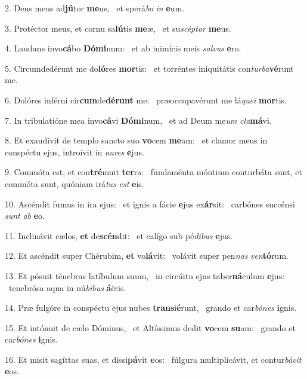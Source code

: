 2. Deus meus ad\textbf{jú}tor \textbf{me}us, \ast\  et sperá\textit{bo} \textit{in} \textbf{e}um.\

3. Protéctor meus, et cornu sa\textbf{lú}tis \textbf{me}æ, \ast\  et su\textit{scép}\textit{tor} \textbf{me}us.\

4. Laudans invo\textbf{cá}bo \textbf{Dó}\textbf{mi}num: \ast\  et ab inimícis meis \textit{sal}\textit{vus} \textbf{e}ro.\

5. Circumdedérunt me do\textbf{ló}res \textbf{mor}tis: \ast\  et torréntes iniquitátis con\textit{tur}\textit{ba}\textbf{vé}runt me.\

6. Dolóres inférni cir\textbf{cum}de\textbf{dé}\textbf{runt} me: \ast\  præoccupavérunt me lá\textit{que}\textit{i} \textbf{mor}tis.\

7. In tribulatióne mea invo\textbf{cá}vi \textbf{Dó}\textbf{mi}num, \ast\  et ad Deum me\textit{um} \textit{cla}\textbf{má}vi.\

8. Et exaudívit de templo sancto suo \textbf{vo}cem \textbf{me}am: \ast\  et clamor meus in conspéctu ejus, introívit in \textit{au}\textit{res} \textbf{e}jus.\

9. Commóta est, et con\textbf{tré}muit \textbf{ter}ra: \ast\  fundaménta móntium conturbáta sunt, et commóta sunt, quóniam irá\textit{tus} \textit{est} \textbf{e}is.\

10. Ascéndit fumus in ira ejus: \dag\  et ignis a fácie \textbf{e}jus ex\textbf{ár}sit: \ast\  carbónes succénsi \textit{sunt} \textit{ab} \textbf{e}o.\

11. Inclinávit cælos, \textbf{et} de\textbf{scén}dit: \ast\  et calígo sub pé\textit{di}\textit{bus} \textbf{e}jus.\

12. Et ascéndit super Chérubim, \textbf{et} vo\textbf{lá}vit: \ast\  volávit super pen\textit{nas} \textit{ven}\textbf{tó}rum.\

13. Et pósuit ténebras latíbulum suum, \dag\  in circúitu ejus taber\textbf{ná}culum \textbf{e}jus: \ast\  tenebrósa aqua in nú\textit{bi}\textit{bus} \textbf{á}ëris.\

14. Præ fulgóre in conspéctu ejus nubes \textbf{trans}i\textbf{é}runt, \ast\  grando et car\textit{bó}\textit{nes} \textbf{i}gnis.\

15. Et intónuit de cælo Dóminus, \dag\  et Altíssimus dedit \textbf{vo}cem \textbf{su}am: \ast\  grando et car\textit{bó}\textit{nes} \textbf{i}gnis.\

16. Et misit sagíttas suas, et dissi\textbf{pá}vit \textbf{e}os: \ast\  fúlgura multiplicávit, et contur\textit{bá}\textit{vit} \textbf{e}os.\

